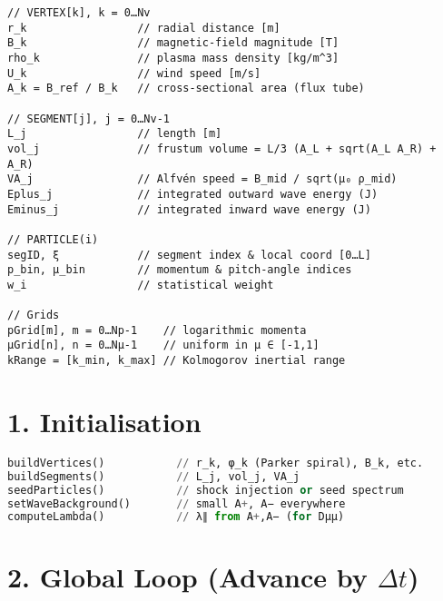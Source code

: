 \begin{lstlisting}
// VERTEX[k], k = 0…Nv
r_k                 // radial distance [m]
B_k                 // magnetic-field magnitude [T]
rho_k               // plasma mass density [kg/m^3]
U_k                 // wind speed [m/s]
A_k = B_ref / B_k   // cross-sectional area (flux tube)

// SEGMENT[j], j = 0…Nv-1
L_j                 // length [m]
vol_j               // frustum volume = L/3 (A_L + sqrt(A_L A_R) + A_R)
VA_j                // Alfvén speed = B_mid / sqrt(μ₀ ρ_mid)
Eplus_j             // integrated outward wave energy (J)
Eminus_j            // integrated inward wave energy (J)

// PARTICLE(i)
segID, ξ            // segment index & local coord [0…L]
p_bin, μ_bin        // momentum & pitch-angle indices
w_i                 // statistical weight

// Grids
pGrid[m], m = 0…Np-1    // logarithmic momenta
μGrid[n], n = 0…Nμ-1    // uniform in μ ∈ [-1,1]
kRange = [k_min, k_max] // Kolmogorov inertial range
\end{lstlisting}

\section*{1. Initialisation}

\begin{lstlisting}[language=Python]
buildVertices()           // r_k, φ_k (Parker spiral), B_k, etc.
buildSegments()           // L_j, vol_j, VA_j
seedParticles()           // shock injection or seed spectrum
setWaveBackground()       // small A+, A− everywhere
computeLambda()           // λ∥ from A+,A− (for Dμμ)
\end{lstlisting}

\section*{2. Global Loop (Advance by $\Delta t$)}


